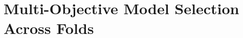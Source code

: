 \documentclass[12pt, draft]{article}
\theoremstyle{plain}
\theoremstyle{definition}
\newcommand{\1}{\mathbf{1}}
\begin{document}
{%









\section{Multi-Objective Model Selection Across Folds}
\label{subsec:model_selection}



}
\end{document}
